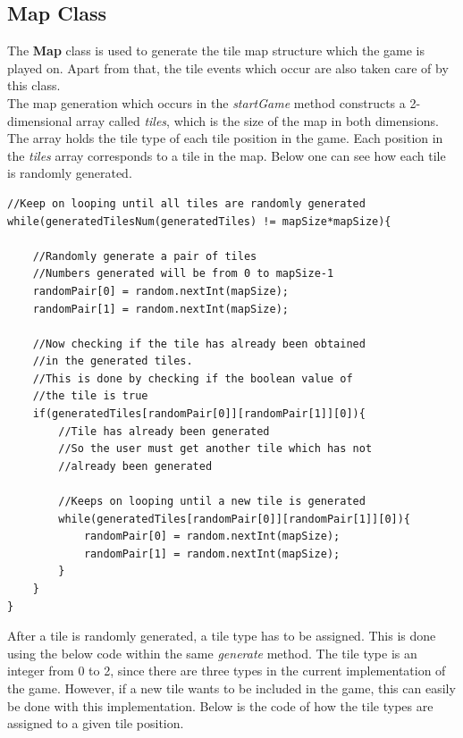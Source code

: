 \documentclass[a4paper,12pt]{extarticle}
\begin{document}
\newpage
\subsection{Map Class}
\noindent The \textbf{Map} class is used to generate the tile map structure which the game is played on. Apart from that, the tile events which occur are also taken care of by this class.\\

\noindent The map generation which occurs in the \textit{startGame} method constructs a 2-dimensional array called \textit{tiles}, which is the size of the map in both dimensions. The array holds the tile type of each tile position in the game. Each position in the \textit{tiles} array corresponds to a tile in the map. Below one can see how each tile is randomly generated.

\begin{lstlisting}
//Keep on looping until all tiles are randomly generated
while(generatedTilesNum(generatedTiles) != mapSize*mapSize){

    //Randomly generate a pair of tiles
    //Numbers generated will be from 0 to mapSize-1
    randomPair[0] = random.nextInt(mapSize);
    randomPair[1] = random.nextInt(mapSize);

    //Now checking if the tile has already been obtained 
    //in the generated tiles.
    //This is done by checking if the boolean value of 
    //the tile is true
    if(generatedTiles[randomPair[0]][randomPair[1]][0]){
        //Tile has already been generated
        //So the user must get another tile which has not
        //already been generated

        //Keeps on looping until a new tile is generated
        while(generatedTiles[randomPair[0]][randomPair[1]][0]){
            randomPair[0] = random.nextInt(mapSize);
            randomPair[1] = random.nextInt(mapSize);
        }
    }
}
\end{lstlisting}
\vspace{4mm}

\noindent After a tile is randomly generated, a tile type has to be assigned. This is done using the below code within the same \textit{generate} method. The tile type is an integer from 0 to 2, since there are three types in the current implementation of the game. However, if a new tile wants to be included in the game, this can easily be done with this implementation. Below is the code of how the tile types are assigned to a given tile position.
\end{document}
